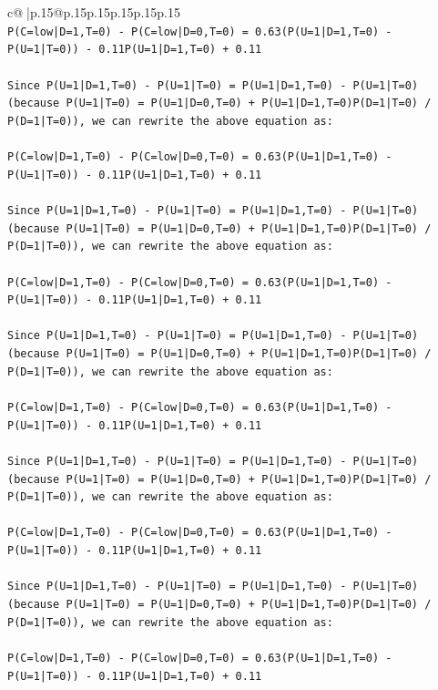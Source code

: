 \documentclass{article}
\begin{document}
{\begin{supertabular}{c@{$\;$}|p{.15\linewidth}@{}p{.15\linewidth}p{.15\linewidth}p{.15\linewidth}p{.15\linewidth}p{.15\linewidth}}
{{{\\ 
\texttt{P(C=low|D=1,T=0) {-} P(C=low|D=0,T=0) = 0.63(P(U=1|D=1,T=0) {-} P(U=1|T=0)) {-} 0.11P(U=1|D=1,T=0) + 0.11} \\
\\ 
\texttt{Since P(U=1|D=1,T=0) {-} P(U=1|T=0) = P(U=1|D=1,T=0) {-} P(U=1|T=0) (because P(U=1|T=0) = P(U=1|D=0,T=0) + P(U=1|D=1,T=0)P(D=1|T=0) / P(D=1|T=0)), we can rewrite the above equation as:} \\
\\ 
\texttt{P(C=low|D=1,T=0) {-} P(C=low|D=0,T=0) = 0.63(P(U=1|D=1,T=0) {-} P(U=1|T=0)) {-} 0.11P(U=1|D=1,T=0) + 0.11} \\
\\ 
\texttt{Since P(U=1|D=1,T=0) {-} P(U=1|T=0) = P(U=1|D=1,T=0) {-} P(U=1|T=0) (because P(U=1|T=0) = P(U=1|D=0,T=0) + P(U=1|D=1,T=0)P(D=1|T=0) / P(D=1|T=0)), we can rewrite the above equation as:} \\
\\ 
\texttt{P(C=low|D=1,T=0) {-} P(C=low|D=0,T=0) = 0.63(P(U=1|D=1,T=0) {-} P(U=1|T=0)) {-} 0.11P(U=1|D=1,T=0) + 0.11} \\
\\ 
\texttt{Since P(U=1|D=1,T=0) {-} P(U=1|T=0) = P(U=1|D=1,T=0) {-} P(U=1|T=0) (because P(U=1|T=0) = P(U=1|D=0,T=0) + P(U=1|D=1,T=0)P(D=1|T=0) / P(D=1|T=0)), we can rewrite the above equation as:} \\
\\ 
\texttt{P(C=low|D=1,T=0) {-} P(C=low|D=0,T=0) = 0.63(P(U=1|D=1,T=0) {-} P(U=1|T=0)) {-} 0.11P(U=1|D=1,T=0) + 0.11} \\
\\ 
\texttt{Since P(U=1|D=1,T=0) {-} P(U=1|T=0) = P(U=1|D=1,T=0) {-} P(U=1|T=0) (because P(U=1|T=0) = P(U=1|D=0,T=0) + P(U=1|D=1,T=0)P(D=1|T=0) / P(D=1|T=0)), we can rewrite the above equation as:} \\
\\ 
\texttt{P(C=low|D=1,T=0) {-} P(C=low|D=0,T=0) = 0.63(P(U=1|D=1,T=0) {-} P(U=1|T=0)) {-} 0.11P(U=1|D=1,T=0) + 0.11} \\
\\ 
\texttt{Since P(U=1|D=1,T=0) {-} P(U=1|T=0) = P(U=1|D=1,T=0) {-} P(U=1|T=0) (because P(U=1|T=0) = P(U=1|D=0,T=0) + P(U=1|D=1,T=0)P(D=1|T=0) / P(D=1|T=0)), we can rewrite the above equation as:} \\
\\ 
\texttt{P(C=low|D=1,T=0) {-} P(C=low|D=0,T=0) = 0.63(P(U=1|D=1,T=0) {-} P(U=1|T=0)) {-} 0.11P(U=1|D=1,T=0) + 0.11} \\
}}}
\end{supertabular}}
\end{document}
